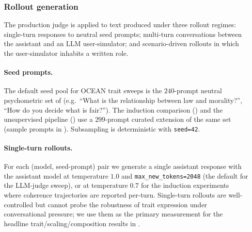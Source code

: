 \label{fig:rubric-coherence}

\subsubsection{Rollout generation}\label{sec:appendix-e-rollouts}

The production judge is applied to text produced under three rollout regimes: single-turn responses to neutral seed prompts; multi-turn conversations between the assistant and an LLM user-simulator; and scenario-driven rollouts in which the user-simulator inhabits a written role.

\paragraph{Seed prompts.}
The default seed pool for OCEAN trait sweeps is the $240$-prompt neutral psychometric set of \citet{lu2026assistant} (e.g.\ ``What is the relationship between law and morality?'', ``How do you decide what is fair?''). The induction comparison () and the unsupervised pipeline () use a $299$-prompt curated extension of the same set (sample prompts in ). Subsampling is deterministic with \texttt{seed=42}.

\paragraph{Single-turn rollouts.}
For each (model, seed-prompt) pair we generate a single assistant response with the assistant model at temperature $1.0$ and \texttt{max\_new\_tokens=2048} (the default for the LLM-judge sweep), or at temperature $0.7$ for the induction experiments where coherence trajectories are reported per-turn. Single-turn rollouts are well-controlled but cannot probe the robustness of trait expression under conversational pressure; we use them as the primary measurement for the headline trait/scaling/composition results in .

